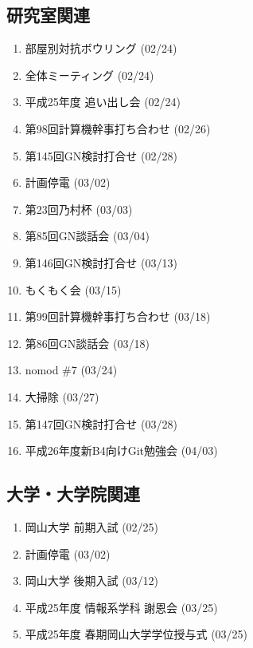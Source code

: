 \documentclass[fleqn, 14pt]{extarticle}
\begin{document}
\subsection{研究室関連}
\label{sec-2-2}
\begin{enumerate}
\item 部屋別対抗ボウリング
\hfill
\label{enum-laboratory1}
(02/24)
\item 全体ミーティング
\hfill
\label{enum-laboratory2}
(02/24)
\item 平成25年度 追い出し会
\hfill
\label{enum-laboratory3}
(02/24)
\item 第98回計算機幹事打ち合わせ
\hfill
\label{enum-laboratory4}
(02/26)
\item 第145回GN検討打合せ
\hfill
\label{enum-laboratory5}
(02/28)
\item 計画停電
\hfill
\label{enum-laboratory6}
(03/02)
\item 第23回乃村杯
\hfill
\label{enum-laboratory7}
(03/03)
\item 第85回GN談話会
\hfill
\label{enum-laboratory8}
(03/04)
\item 第146回GN検討打合せ
\hfill
\label{enum-laboratory9}
(03/13)
\item もくもく会
\hfill
\label{enum-laboratory10}
(03/15)
\item 第99回計算機幹事打ち合わせ
\hfill
\label{enum-laboratory11}
(03/18)
\item 第86回GN談話会
\hfill
\label{enum-laboratory12}
(03/18)
\item nomod \#7
\hfill
\label{enum-laboratory13}
(03/24)
\item 大掃除
\hfill
\label{enum-laboratory14}
(03/27)
\item 第147回GN検討打合せ
\hfill
\label{enum-laboratory15}
(03/28)
\item 平成26年度新B4向けGit勉強会
\hfill
\label{enum-laboratory16}
(04/03)
\end{enumerate}

\subsection{大学・大学院関連}
\label{sec-2-3}
\begin{enumerate}
\item 岡山大学 前期入試
\hfill
\label{enum-university1}
(02/25)
\item 計画停電
\hfill
\label{enum-university2}
(03/02)
\item 岡山大学 後期入試
\hfill
\label{enum-university3}
(03/12)
\item 平成25年度 情報系学科 謝恩会
\hfill
\label{enum-university4}
(03/25)
\item 平成25年度 春期岡山大学学位授与式
\hfill
\label{enum-university5}
(03/25)
\end{enumerate}
\end{document}
